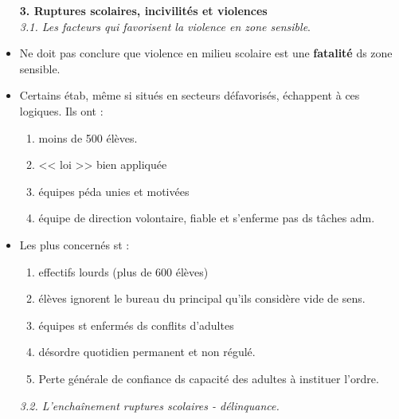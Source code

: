 \documentclass[12pt]{article}
\begin{document}
\begin{itemize}
\textbf{3. Ruptures scolaires, incivilités et violences} \\
\textit{3.1. Les facteurs qui favorisent la violence en zone sensible}.\\

\item Ne doit pas conclure que violence en milieu scolaire est une \textbf{fatalité} ds zone sensible.\\

\item Certains étab, même si situés en secteurs défavorisés, échappent à ces logiques. Ils ont : 
\begin{enumerate}
\item moins de 500 élèves.
\item << loi >> bien appliquée
\item équipes péda unies et motivées
\item équipe de direction volontaire, fiable et s'enferme pas ds tâches adm.
\end{enumerate}

\vspace{0.5cm}

\item  Les plus concernés st : 
\begin{enumerate}
\item effectifs lourds (plus de 600 élèves)
\item élèves ignorent le bureau du principal qu'ils considère vide de sens.
\item équipes st enfermés ds conflits d'adultes
\item désordre quotidien permanent et non  régulé.
\item Perte générale de confiance ds capacité des adultes à instituer l'ordre. \\
\end{enumerate}

\textit{3.2. L'enchaînement ruptures scolaires - délinquance.} \\


\end{itemize}
\end{document}
